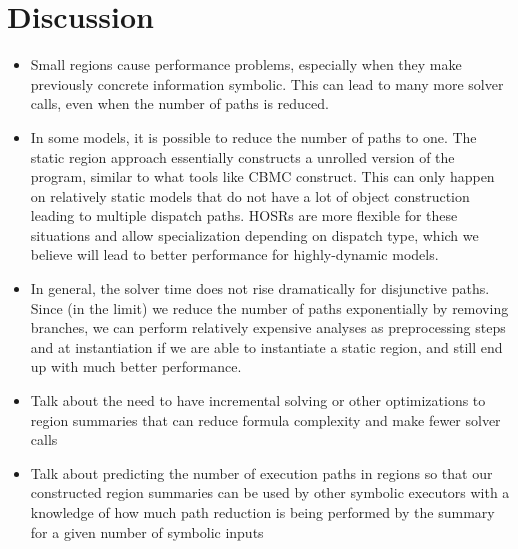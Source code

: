 \section{Discussion}
\begin{itemize}

\item Small regions cause performance problems, especially when they make previously concrete information symbolic.
This can lead to many more solver calls, even when the number of paths is reduced.
    
\item In some models, it is possible to reduce the number of paths to one.  The static region approach essentially
constructs a unrolled version of the program, similar to what tools like CBMC construct.   This can only happen on
relatively static models that do not have a lot of object construction leading to multiple dispatch paths.  HOSRs are
more flexible for these situations and allow specialization depending on dispatch type, which we believe will lead to
better performance for highly-dynamic models.
    
\item In general, the solver time does not rise dramatically for disjunctive paths. Since (in the limit) we reduce the
number of paths exponentially by removing branches, we can perform relatively expensive analyses as preprocessing steps
and at instantiation if we are able to instantiate a static region, and still end up with much better performance.

\item Talk about the need to have incremental solving or other optimizations to region summaries that can reduce formula
complexity and make fewer solver calls
    
\item Talk about predicting the number of execution paths in regions so that our constructed region summaries can be
used by other symbolic executors with a knowledge of how much path reduction is being performed by the summary for a
given number of symbolic inputs
 
\end{itemize}
